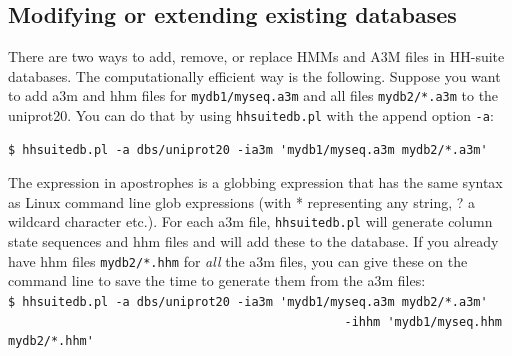 \documentclass[11pt,a4paper]{article}
\begin{document}
%


\subsection{Modifying or extending existing databases}

There are two ways to add, remove, or replace HMMs and A3M files in HH-suite databases. The computationally efficient way is the following. Suppose you want to add a3m and hhm files for \verb`mydb1/myseq.a3m` and all files \verb`mydb2/*.a3m` to the uniprot20. You can do that by using \verb`hhsuitedb.pl` with the append option \verb`-a`:   
\begin{verbatim}
$ hhsuitedb.pl -a dbs/uniprot20 -ia3m 'mydb1/myseq.a3m mydb2/*.a3m' 
\end{verbatim}
The expression in apostrophes is a globbing expression that has the same syntax as Linux command line glob expressions (with * representing any string, ? a wildcard character etc.). For each a3m file, \verb`hhsuitedb.pl` will generate column state sequences and hhm files and will add these to the database. If you already have hhm files \verb`mydb2/*.hhm` for \emph{all} the a3m files, you can give these on the command line to save the time to generate them from the a3m files: 
\\[-1mm]

\verb`$ hhsuitedb.pl -a dbs/uniprot20 -ia3m 'mydb1/myseq.a3m mydb2/*.a3m'`\\
\verb`                                               -ihhm 'mydb1/myseq.hhm mydb2/*.hhm'`\\[-1mm]
\end{document}
